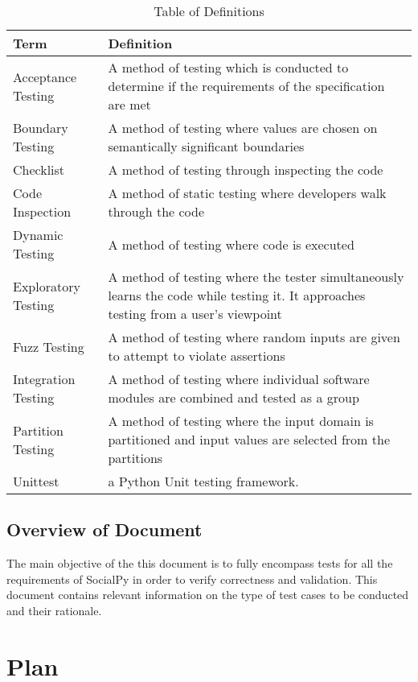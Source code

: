 \documentclass[12pt, titlepage]{article}
\begin{document}
\begin{table}[htbp]
    \caption{Table of Definitions}
    \label{Table of Definitions}
    \begin{tabularx}{\textwidth}{p{4cm}X}
        \toprule
        \textbf{Term} & \textbf{Definition}\\
        \midrule
        Acceptance Testing & A method of testing which is conducted to determine if the requirements of the specification are met\\
        Boundary Testing & A method of testing where values are chosen on semantically significant boundaries\\
        Checklist & A method of testing through inspecting the code\\
        Code Inspection & A method of static testing where developers walk through the code\\
        Dynamic Testing & A method of testing where code is executed\\
        Exploratory Testing & A method of testing where the tester simultaneously learns the code while testing it. It approaches testing from a user's viewpoint\\
        Fuzz Testing & A method of testing where random inputs are given to attempt to violate assertions\\
        Integration Testing & A method of testing where individual software modules are combined and tested as a group\\
        Partition Testing & A method of testing where the input domain is partitioned and input values are selected from the partitions\\
        Unittest & a Python Unit testing framework.\\
        \bottomrule
    \end{tabularx}
\end{table}

\newpage
\subsection{Overview of Document}
The main objective of the this document is to fully encompass tests for all the requirements of SocialPy in order to verify correctness and validation. This document contains relevant information on the type of test cases to be conducted and their rationale.

\section{Plan}
	
\end{document}
